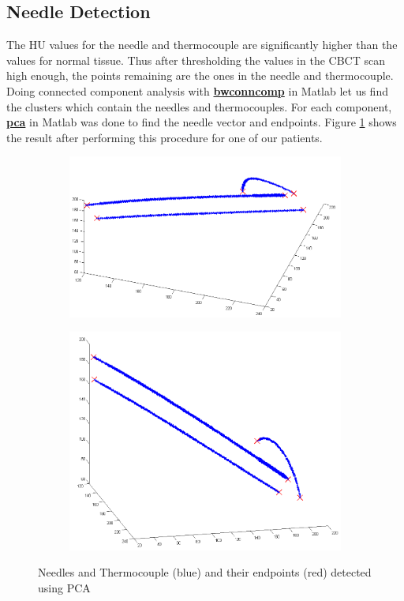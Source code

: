 \documentclass[]{spie}  %
\begin{document}
\subsection{Needle Detection}

The HU values for the needle and thermocouple are significantly higher than the values for normal tissue. Thus after thresholding the values in the CBCT scan high enough, the points remaining are the ones in the needle and thermocouple. Doing connected component analysis with \textbf{\href{http://www.mathworks.com/help/images/ref/bwconncomp.html}{bwconncomp}} \cite{bwconncomp} in Matlab let us find the clusters which contain the needles and thermocouples. For each component, \textbf{\href{http://www.mathworks.com/help/stats/pca.html}{pca}} \cite{pca} in Matlab was done to find the needle vector and endpoints. Figure \ref{needleDetection} shows the result after performing this procedure for one of our patients.

\begin{figure} 
\centering 
\begin{subfigure}[t]{0.45\textwidth} 
\includegraphics[width=\textwidth]{needleDetection3D_1.png}
\end{subfigure} 
\begin{subfigure}[t]{0.45\textwidth} 
\includegraphics[width=\textwidth]{needleDetection3D_2.png} 
\end{subfigure} 
\caption{Needles and Thermocouple (blue) and their endpoints (red) detected using PCA}
\label{needleDetection} 
\end{figure}
\end{document}
